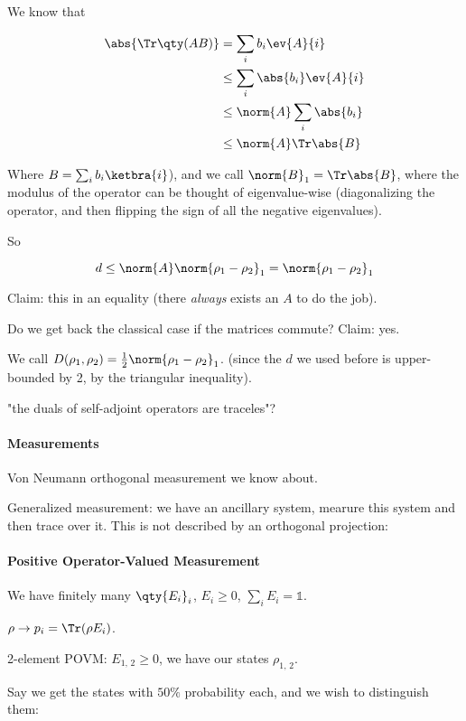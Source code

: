 We know that

\begin{align}
  \abs{\Tr \qty(AB)} &= \sum_i b_i \ev{A}{i} \\
  &\leq \sum_i \abs{b_i} \ev{A}{i} \\
  &\leq \norm{A} \sum_i \abs{b_i} \\
  &\leq \norm{A} \Tr \abs{B}
\end{align}

Where \(B = \sum_i b_i \ketbra{i}\)),
and we call \(\norm{B}_1 = \Tr \abs{B}\), where the modulus of the operator can be thought of eigenvalue-wise (diagonalizing the operator, and then flipping the sign of all the negative eigenvalues).

So

\begin{equation}
  d \leq \norm{A} \norm{\rho_1 - \rho_2}_1 = \norm{\rho_1 - \rho_2}_1
\end{equation}

Claim: this in an equality (there \emph{always} exists an $A$ to do the job).

Do we get back the classical case if the matrices commute? Claim: yes.

We call \(D(\rho_1, \rho_2) = \frac{1}{2} \norm{\rho_1 - \rho_2}_1\). (since the $d$ we used before is upper-bounded by 2, by the triangular inequality).

"the duals of self-adjoint operators are traceles"?

\paragraph{Measurements}
Von Neumann orthogonal measurement we know about.

Generalized measurement: we have an ancillary system, mearure this system and then trace over it. This is not described by an orthogonal projection:

\paragraph{Positive Operator-Valued Measurement}

We have finitely many \(\qty{E_i}_i\), \(E_i \geq 0\),  \(\sum_i E_i = \mathbb{1}\).

\(\rho \rightarrow p_i = \Tr (\rho E_i)\).

2-element POVM: \(E_{1, \, 2} \geq 0\), we have our states \(\rho_{1, \, 2}\).

Say we get the states with \(50\%\) probability each, and we wish to distinguish them:

